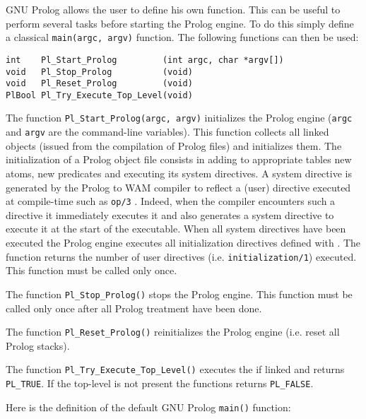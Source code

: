 GNU Prolog allows the user to define his own 
function. This can be useful to perform several tasks before starting
the Prolog engine. To do this simply define a classical
\texttt{main(argc, argv)} function. The following functions can then be used:

\begin{Indentation}
\begin{verbatim}
int    Pl_Start_Prolog         (int argc, char *argv[])
void   Pl_Stop_Prolog          (void)
void   Pl_Reset_Prolog         (void)
PlBool Pl_Try_Execute_Top_Level(void)
\end{verbatim}
\end{Indentation}

The function \texttt{Pl\_Start\_Prolog(argc, argv)} initializes the Prolog
engine (\texttt{argc} and \texttt{argv} are the command-line variables). This
function collects all linked objects (issued from the compilation of Prolog
files) and initializes them. The initialization of a Prolog object file
consists in adding to appropriate tables new atoms, new predicates and
executing its system directives. A system directive is generated by the
Prolog to WAM compiler to reflect a (user) directive executed at compile-time
such as \texttt{op/3} . Indeed, when the compiler encounters such
a directive it immediately executes it and also generates a system directive
to execute it at the start of the executable.  When all system directives
have been executed the Prolog engine executes all initialization directives
defined with 
. The function returns the number of user
directives (i.e. \texttt{initialization/1}) executed. This function must be
called only once.

The function \texttt{Pl\_Stop\_Prolog()} stops the Prolog engine. This function
must be called only once after all Prolog treatment have been done.

The function \texttt{Pl\_Reset\_Prolog()} reinitializes the Prolog engine
(i.e. reset all Prolog stacks).

The function \texttt{Pl\_Try\_Execute\_Top\_Level()} executes the
 if linked  and returns
\texttt{PL\_TRUE}. If the top-level is not present the functions returns
\texttt{PL\_FALSE}.

Here is the definition of the default GNU Prolog \texttt{main()} function:


